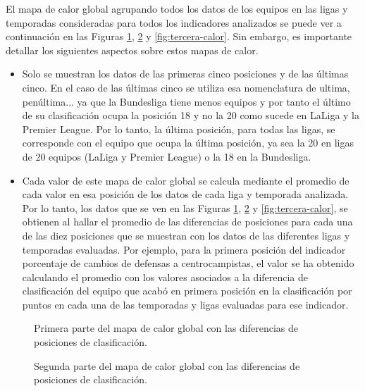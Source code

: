 El mapa de calor global agrupando todos los datos de los equipos en las ligas y temporadas consideradas para todos los indicadores analizados se puede ver a continuación en las Figuras \ref{fig:primera-calor}, \ref{fig:segunda-calor} y \ref{fig:tercera-calor}. Sin embargo, es importante detallar los siguientes aspectos sobre estos mapas de calor.
\begin{itemize}
    \item Solo se muestran los datos de las primeras cinco posiciones y de las últimas cinco. En el caso de las últimas cinco se utiliza esa nomenclatura de ultima, penúltima... ya que la Bundesliga tiene menos equipos y por tanto el último de su clasificación ocupa la posición 18 y no la 20 como sucede en LaLiga y la Premier League. Por lo tanto, la última posición, para todas las ligas, se corresponde con el equipo que ocupa la última posición, ya sea la 20 en ligas de 20 equipos (LaLiga y Premier League) o la 18 en la Bundesliga.
    \item Cada valor de este mapa de calor global se calcula mediante el promedio de cada valor en esa posición de los datos de cada liga y temporada analizada. Por lo tanto, los datos que se ven en las Figuras \ref{fig:primera-calor}, \ref{fig:segunda-calor} y \ref{fig:tercera-calor}, se obtienen al hallar el promedio de las diferencias de posiciones para cada una de las diez posiciones que se muestran con los datos de las diferentes ligas y temporadas evaluadas. Por ejemplo, para la primera posición del indicador porcentaje de cambios de defensas a centrocampistas, el valor se ha obtenido calculando el promedio con los valores asociados a la diferencia de clasificación del equipo que acabó en primera posición en la clasificación por puntos en cada una de las temporadas y ligas evaluadas para ese indicador. 
\end{itemize}

\begin{figure}[H]
    \centering
    \caption{Primera parte del mapa de calor global con las diferencias de posiciones de clasificación. }
    \label{fig:primera-calor}
\end{figure}

\begin{figure}[H]
    \centering
    \caption{Segunda parte del mapa de calor global con las diferencias de posiciones de clasificación. }
    \label{fig:segunda-calor}
\end{figure}

